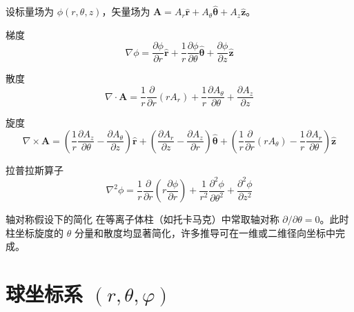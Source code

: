 \documentclass[12pt,a4paper,openany,oneside]{book}
\newcommand{\vect}[1]{\bm{#1}}
\newcommand{\unitvec}[1]{\hat{\vect{#1}}}
\newcommand{\grad}{\nabla}
\newcommand{\curl}{\nabla\times}
\newcommand{\divg}{\nabla\cdot}
\newcommand{\lap}{\nabla^2}
\begin{document}
设标量场为 $\phi(r,\theta,z)$，矢量场为 $\vect{A}=A_r\unitvec{r}+A_\theta\unitvec{\theta}+A_z\unitvec{z}$。

\begin{definition}{梯度}{}{}
\begin{equation}
\grad\phi = \frac{\partial \phi}{\partial r}\unitvec{r} + \frac{1}{r}\frac{\partial \phi}{\partial \theta}\unitvec{\theta} + \frac{\partial \phi}{\partial z}\unitvec{z}
\end{equation}
\end{definition}

\begin{definition}{散度}{}{}
\begin{equation}
\divg\vect{A} = \frac{1}{r}\frac{\partial }{\partial r}(rA_r) + \frac{1}{r}\frac{\partial A_\theta}{\partial \theta} + \frac{\partial A_z}{\partial z}
\end{equation}
\end{definition}

\begin{definition}{旋度}{}{}
\begin{equation}
\curl\vect{A} =
\left(\frac{1}{r}\frac{\partial A_z}{\partial \theta}-\frac{\partial A_\theta}{\partial z}\right)\unitvec{r}
+ \left(\frac{\partial A_r}{\partial z}-\frac{\partial A_z}{\partial r}\right)\unitvec{\theta}
+ \left(\frac{1}{r}\frac{\partial }{\partial r}(rA_\theta)-\frac{1}{r}\frac{\partial A_r}{\partial \theta}\right)\unitvec{z}
\end{equation}
\end{definition}

\begin{definition}{拉普拉斯算子}{}{}
\begin{equation}
\lap\phi = \frac{1}{r}\frac{\partial }{\partial r}\!\left(r\frac{\partial \phi}{\partial r}\right)
+ \frac{1}{r^2}\frac{\partial^2 \phi}{\partial \theta^2} + \frac{\partial^2 \phi}{\partial z^2}
\end{equation}
\end{definition}

\begin{insight}{轴对称假设下的简化}{}
在等离子体柱（如托卡马克）中常取轴对称 $\partial/\partial\theta=0$。此时柱坐标旋度的 $\theta$ 分量和散度均显著简化，许多推导可在一维或二维径向坐标中完成。
\end{insight}


\section{球坐标系 \texorpdfstring{$(r,\theta,\varphi)$}{(r,θ,φ)}}
\end{document}
